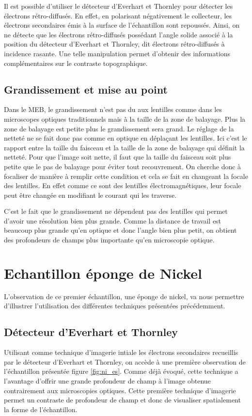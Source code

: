 \documentclass[a4paper,12pt]{article}
\newcommand\ett{Everhart et Thornley\xspace}
\begin{document}
Il est possible d'utiliser le détecteur d'\ett  pour détecter les électrons rétro-diffusés.
En effet, en polarisant négativement le collecteur, les électrons secondaires émis à la surface de l'échantillon sont repoussés.
Ainsi, on ne détecte que les électrons rétro-diffusés possédant l'angle solide associé à la position du détecteur d'\ett, dit électrons rétro-diffusés à incidence rasante.
Une telle manipulation permet d'obtenir des informations complémentaires sur le contraste topographique.
\subsection{Grandissement et mise au point}
Dans le MEB, le grandissement n'est pas du aux lentilles comme dans les microscopes optiques traditionnels mais à la taille de la zone de balayage. Plus la zone de balayage est petite plus le grandissement sera grand. Le réglage de la netteté ne se fait donc pas comme en optique en déplaçant les lentilles. Ici c'est le rapport entre la taille du faisceau et la taille de la zone de balayage qui définit la netteté. Pour que l'image soit nette, il faut que la taille du faisceau soit plus petite que le pas de balayage pour éviter tout recouvrement. On cherche donc à focaliser de manière à remplir cette condition et cela se fait en changeant la focale des lentilles. En effet comme ce sont des lentilles électromagnétiques, leur focale peut être changée en modifiant le courant qui les traverse.


C'est le fait que le grandissement ne dépendent pas des lentilles qui permet d'avoir une résolution bien plus grande. Comme la distance de travail est beaucoup plus grande qu'en optique et donc l'angle bien plus petit, on obtient des profondeurs de champs plus importante qu'en microscopie optique. 


\section{Echantillon éponge de Nickel}

L'observation de ce premier échantillon, une éponge de nickel, va nous permettre d'illustrer l'utilisation des différentes techniques présentées précédemment.

\subsection{Détecteur d'\ett}

Utilisant comme technique d'imagerie intiale les électrons secondaires recueillis par le détecteur d'\ett,
on accède à une première observation de l'échantillon présentée figure \ref{fig:ni_es}. Comme déjà évoqué,
cette technique a l'avantage d'offrir une grande profondeur de champ à l'image obtenue contrairement aux microscopies optiques. Cette première technique d'imagerie permet un contraste de profondeur de champ et donc de visualiser spatialement la forme de l'échantillon.
\end{document}
